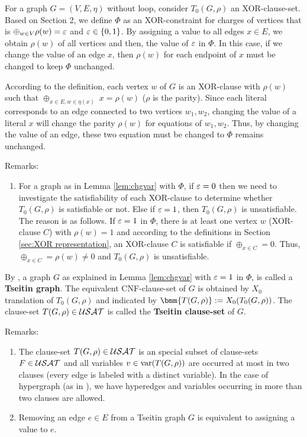 \documentclass{report}
\begin{document}
\begin{lem}\label{lem:chgvar}
 For a graph $G=(V,E,\eta)$ without loop, consider $T_0(G,\rho)$ an XOR-clause-set. Based on \cite{Ts68} Section 2, we define $\Phi$ as an XOR-constraint for charges of vertices that is $\oplus_{w \in V} \rho(w) = \varepsilon$ and $\varepsilon \in \{ 0,1 \}$. By assigning a value to all edges $x \in E$, we obtain $\rho(w)$ of all vertices and then, the value of $\varepsilon$ in $\Phi$. In this case, if we change the value of an edge $x$, then $\rho(w)$ for each endpoint of $x$ must be changed to keep $\Phi$ unchanged.
\end{lem}
\begin{prf}
According to the definition, each vertex $w$ of $G$ is an XOR-clause with $\rho(w)$ such that  $\oplus_{x \in E, w \in \eta(x)} \; x = \rho(w)$ ($\rho$ is the parity). Since each literal corresponds to an edge connected to two vertices $w_1, w_2$, changing the value of a literal $x$ will change the parity $\rho(w)$ for equations of $w_1, w_2$. Thus, by changing the value of an edge, these two equation must be changed to $\Phi$ remains unchanged.
\end{prf}
Remarks:
  \begin{enumerate}
  \item For a graph as in Lemma \ref{lem:chgvar} with $\Phi$, if $\varepsilon=0$ then we need to investigate the satisfiability of each XOR-clause to determine whether $T_0(G,\rho)$ is satisfiable or not. Else if $\varepsilon=1$, then $T_0(G,\rho)$ is unsatisfiable. The reason is as follows. If $\varepsilon=1$ in $\Phi$, there is at least one vertex $w$ (XOR-clause $C$) with $ \rho(w) =1$ and according to the definitions in Section \ref{sec:XOR representation}, an XOR-clause $C$ is satisfiable if $\oplus_{x \in C} = 0$. Thus, $\oplus_{x \in C} = \rho(w) \not =0$ and $T_0(G,\rho)$ is unsatisfiable.
  \end{enumerate}

\begin{defi}\label{def:tseitindef}
By \cite{GwynneKullmann2013GoodRepresentationsIIex}, a graph $G$ as explained in Lemma \ref{lem:chgvar} with $\varepsilon=1$ in $\Phi$, is called a \textbf{Tseitin graph}. The equivalent CNF-clause-set of $G$ is obtained by $X_0$ translation of $T_0(G,\rho)$ and indicated by $\bmm{T(G,\rho)} := X_0(T_0(G,\rho))$. The clause-set $T(G,\rho) \in \mathcal{USAT}$ is called the \textbf{Tseitin clause-set} of $G$.
\end{defi}
Remarks:
  \begin{enumerate}
  \item The clause-set $T(G,\rho) \in \mathcal{USAT}$ is an special subset of clause-sets $F \in \mathcal{USAT}$ and all variables $v \in \operatorname{var}(T(G,\rho) )$ are occurred at most in two clauses (every edge is labeled with a distinct variable). In the case of hypergraph (as in \cite{BeyersdorffGwynneKullmann2013PHPER}), we have hyperedges and variables occurring in more than two clauses are allowed.
  \item Removing an edge $e \in E$ from a Tseitin graph $G$ is equivalent to assigning a value to $e$.
\end{enumerate}
\end{document}
